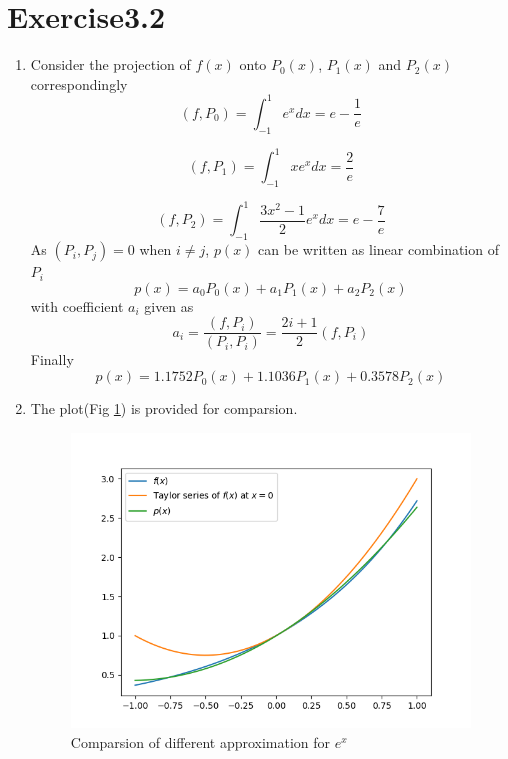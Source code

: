 \documentclass[paper=a4, fontsize=11pt]{scrartcl} %
\numberwithin{equation}{section} %
\numberwithin{figure}{section} %
\numberwithin{table}{section} %
\begin{document}
\section{Exercise3.2}
	\begin{enumerate}
		\item 
			Consider the projection of $f(x)$ onto $P_0(x)$, $P_1(x)$ and $P_2(x)$ correspondingly
			\begin{equation}
				(f, P_0) = \int_{-1}^{1} e^x dx = e - \frac{1}{e}
			\end{equation} 
			
			\begin{equation}
				(f, P_1) = \int_{-1}^{1} x e^x dx = \frac{2}{e}
			\end{equation}
			
			\begin{equation}
				(f, P_2) = \int_{-1}^{1} \frac{3x^2 -1}{2} e^x dx = e - \frac{7}{e}
			\end{equation}
			As $(P_i, P_j)=0$ when $i \neq j$, $p(x)$ can be written as linear combination of $P_i$
			\begin{equation}
				p(x) = a_0 P_0(x) + a_1 P_1(x) + a_2 P_2(x)
			\end{equation}
			with coefficient $a_i$ given as
			\begin{equation}
				a_i = \frac{(f, P_i)}{(P_i, P_i)} = \frac{2i+1}{2} (f, P_i)
			\end{equation}
			Finally
			\begin{equation}
				p(x) = 1.1752 P_0(x) + 1.1036 P_1(x) + 0.3578 P_2(x)
			\end{equation}
			
		\item 
		The plot(Fig \ref{fig:comp}) is provided for comparsion.
	
		\begin{figure}[ht]
			\centering
			\includegraphics[]{../pic/ApproximationCompare.png}
			\caption{Comparsion of different approximation for $e^x$}
			\label{fig:comp}
		\end{figure}
	

\end{enumerate}
\end{document}

